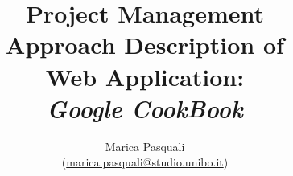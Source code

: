 \documentclass{report}
\title{
    Project Management \\
    \textbf{ 
        Approach Description of \\ 
        Web Application: \\
        \textit{Google CookBook}
    }
}
\author{
    Marica Pasquali \\ 
    (\href{mailto:marica.pasquali@studio.unibo.it}{marica.pasquali@studio.unibo.it})
}
\begin{document}
\maketitle

\listoftodos
\tableofcontents


\newpage

\newpage

\newpage

\newpage

\newpage

\end{document}
